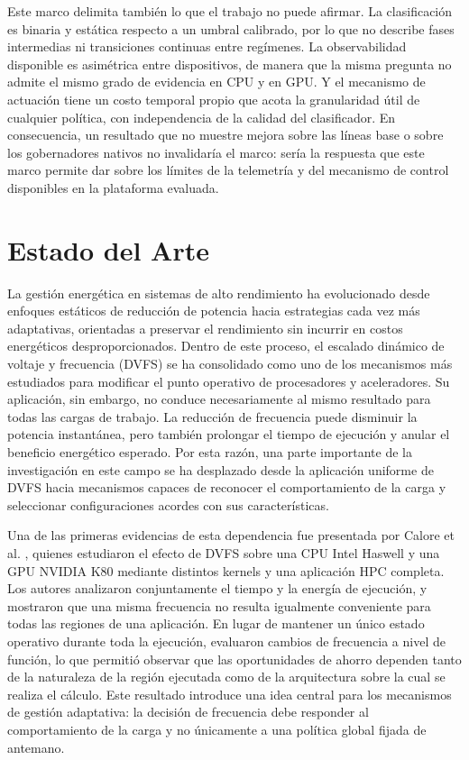Este marco delimita también lo que el trabajo no puede afirmar. La
clasificación es binaria y estática respecto a un umbral calibrado, por lo que
no describe fases intermedias ni transiciones continuas entre regímenes. La
observabilidad disponible es asimétrica entre dispositivos, de manera que la
misma pregunta no admite el mismo grado de evidencia en CPU y en GPU. Y el
mecanismo de actuación tiene un costo temporal propio que acota la granularidad
útil de cualquier política, con independencia de la calidad del clasificador.
En consecuencia, un resultado que no muestre mejora sobre las líneas base o
sobre los gobernadores nativos no invalidaría el marco: sería la respuesta que
este marco permite dar sobre los límites de la telemetría y del mecanismo de
control disponibles en la plataforma evaluada.


\section{Estado del Arte}
\label{sec:estado-del-arte}

La gestión energética en sistemas de alto rendimiento ha evolucionado desde enfoques estáticos de reducción de potencia hacia estrategias cada vez más adaptativas, orientadas a preservar el rendimiento sin incurrir en costos energéticos desproporcionados. Dentro de este proceso, el escalado dinámico de voltaje y frecuencia (DVFS) se ha consolidado como uno de los mecanismos más estudiados para modificar el punto operativo de procesadores y aceleradores. Su aplicación, sin embargo, no conduce necesariamente al mismo resultado para todas las cargas de trabajo. La reducción de frecuencia puede disminuir la potencia instantánea, pero también prolongar el tiempo de ejecución y anular el beneficio energético esperado. Por esta razón, una parte importante de la investigación en este campo se ha desplazado desde la aplicación uniforme de DVFS hacia mecanismos capaces de reconocer el comportamiento de la carga y seleccionar configuraciones acordes con sus características.

Una de las primeras evidencias de esta dependencia fue presentada por Calore et al. \cite{Calore2017}, quienes estudiaron el efecto de DVFS sobre una CPU Intel Haswell y una GPU NVIDIA K80 mediante distintos kernels y una aplicación HPC completa. Los autores analizaron conjuntamente el tiempo y la energía de ejecución, y mostraron que una misma frecuencia no resulta igualmente conveniente para todas las regiones de una aplicación. En lugar de mantener un único estado operativo durante toda la ejecución, evaluaron cambios de frecuencia a nivel de función, lo que permitió observar que las oportunidades de ahorro dependen tanto de la naturaleza de la región ejecutada como de la arquitectura sobre la cual se realiza el cálculo. Este resultado introduce una idea central para los mecanismos de gestión adaptativa: la decisión de frecuencia debe responder al comportamiento de la carga y no únicamente a una política global fijada de antemano.


